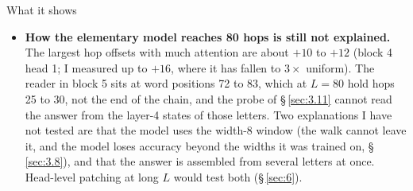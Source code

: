 \documentclass[paper=a4,fontsize=11pt,DIV=11,parskip=half,headings=small,numbers=noendperiod]{scrartcl}
\DeclareRobustCommand{\lead}[1]{\textsf{\bfseries\color{accent}#1}}
\begin{document}
\begin{findbox}{What it shows}
\begin{itemize}
  (0.70, 0.54 and 0.91 for $L=12$, 40 and 80; 0.50, 0.28 and 0.83 with the mean), so at $L=80$ the readout is
  spread over several heads. In the general model the readout heads are in blocks 2, 4 and 5 and each costs 20
  to 35 points at $L=16$ (block 2 head 2, which reads hop 1: 0.65; block 4 head 1: 0.78; block 5 heads 1, 4 and
  5: 0.71, 0.79 and 0.80).
\item \lead{How the elementary model reaches 80 hops is still not explained.} The largest hop offsets with much
  attention are about $+10$ to $+12$ (block 4 head 1; I measured up to $+16$, where it has fallen to $3\times$
  uniform). The reader in block 5 sits at word positions 72 to 83, which at $L=80$ hold hops 25 to 30, not the
  end of the chain, and the probe of \S\,\ref{sec:3.11} cannot read the answer from the layer-4 states of those
  letters. Two explanations I have not tested are that the model uses the width-8 window (the walk cannot leave
  it, and the model loses accuracy beyond the widths it was trained on, \S\,\ref{sec:3.8}), and that the answer
  is assembled from several letters at once. Head-level patching at long $L$ would test both (\S\,\ref{sec:6}).
\end{itemize}
\end{findbox}
\end{document}
